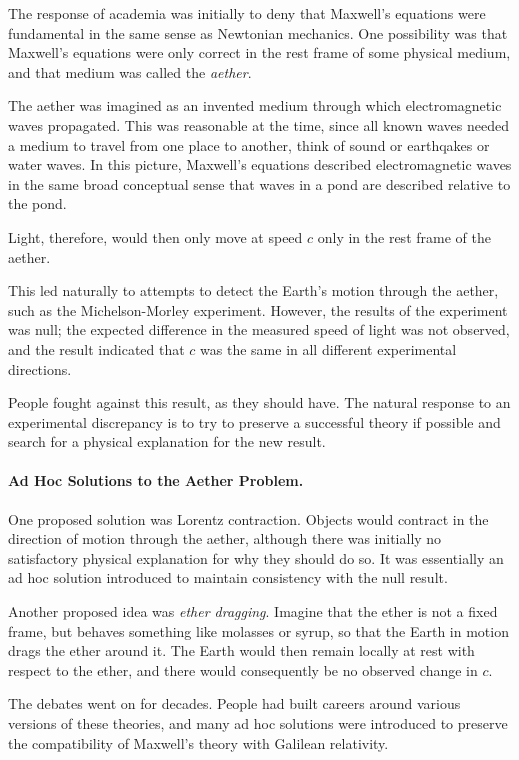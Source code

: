 		The response of academia was initially to deny that Maxwell's equations were fundamental in the same sense as Newtonian mechanics. One possibility was that Maxwell's equations were only correct in the rest frame of some physical medium, and that medium was called the \textit{aether}.

		The aether was imagined as an invented medium through which electromagnetic waves propagated. This was reasonable at the time, since
		all known waves needed a medium to travel from one place to another, think of sound or earthqakes or water waves.
		In this picture, Maxwell's equations described electromagnetic waves in the same broad conceptual sense that waves 
		in a pond are described relative to the pond.

		Light, therefore, would then only move at speed $c$ only in the rest frame of the aether.

		This led naturally to attempts to detect the Earth's motion through the aether, such as the Michelson-Morley experiment. However, the results of the experiment was null; the expected difference in the measured speed of light was not observed, and the result indicated that $c$ was the same in all different experimental directions.

		People fought against this result, as they should have. The natural response to an experimental discrepancy is to try to preserve a successful theory if possible and search for a physical explanation for the new result.

	\paragraph{Ad Hoc Solutions to the Aether Problem.}

		One proposed solution was Lorentz contraction. Objects would contract in the direction of motion through the aether, although there was initially no satisfactory physical explanation for why they should do so. It was essentially an ad hoc solution introduced to maintain consistency with the null result.

		Another proposed idea was \textit{ether dragging}. Imagine that the ether is not a fixed frame, but behaves something like molasses or syrup, so that the Earth in motion drags the ether around it. The Earth would then remain locally at rest with respect to the ether, and there would consequently be no observed change in $c$.

		The debates went on for decades. People had built careers around various versions of these theories, and many ad hoc solutions were introduced to preserve the compatibility of Maxwell's theory with Galilean relativity.

